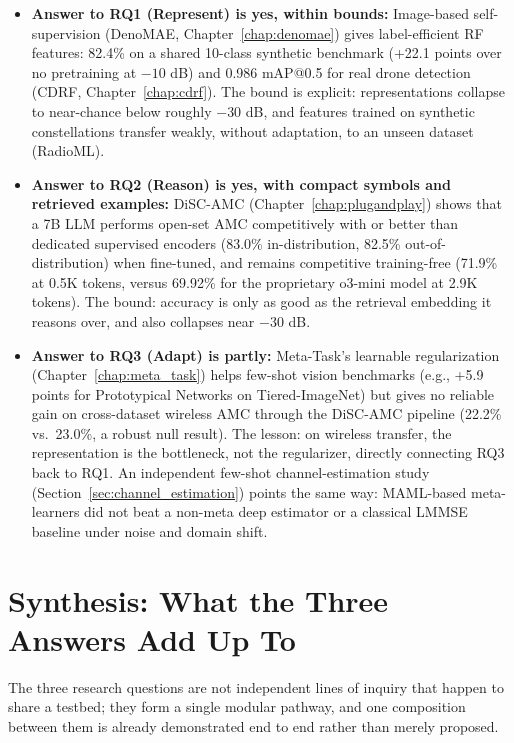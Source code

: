 \begin{itemize}
    \item \textbf{Answer to RQ1 (Represent) is yes, within bounds:} Image-based self-supervision (DenoMAE, Chapter~\ref{chap:denomae}) gives label-efficient RF features: 82.4\% on a shared 10-class synthetic benchmark (+22.1 points over no pretraining at $-10$ dB) and 0.986 mAP@0.5 for real drone detection (CDRF, Chapter~\ref{chap:cdrf}). The bound is explicit: representations collapse to near-chance below roughly $-30$ dB, and features trained on synthetic constellations transfer weakly, without adaptation, to an unseen dataset (RadioML).
    \item \textbf{Answer to RQ2 (Reason) is yes, with compact symbols and retrieved examples:} DiSC-AMC (Chapter~\ref{chap:plugandplay}) shows that a 7B LLM performs open-set AMC competitively with or better than dedicated supervised encoders (83.0\% in-distribution, 82.5\% out-of-distribution) when fine-tuned, and remains competitive training-free (71.9\% at 0.5K tokens, versus 69.92\% for the proprietary o3-mini model at 2.9K tokens). The bound: accuracy is only as good as the retrieval embedding it reasons over, and also collapses near $-30$ dB.
    \item \textbf{Answer to RQ3 (Adapt) is partly:} Meta-Task's learnable regularization (Chapter~\ref{chap:meta_task}) helps few-shot vision benchmarks (e.g., +5.9 points for Prototypical Networks on Tiered-ImageNet) but gives no reliable gain on cross-dataset wireless AMC through the DiSC-AMC pipeline (22.2\% vs.\ 23.0\%, a robust null result). The lesson: on wireless transfer, the representation is the bottleneck, not the regularizer, directly connecting RQ3 back to RQ1. An independent few-shot channel-estimation study (Section~\ref{sec:channel_estimation}) points the same way: MAML-based meta-learners did not beat a non-meta deep estimator or a classical LMMSE baseline under noise and domain shift.
\end{itemize}

\section{Synthesis: What the Three Answers Add Up To}
\label{sec:synthesis}

The three research questions are not independent lines of inquiry that happen to share a testbed; they form a single modular pathway, and one composition between them is already demonstrated end to end rather than merely proposed.


